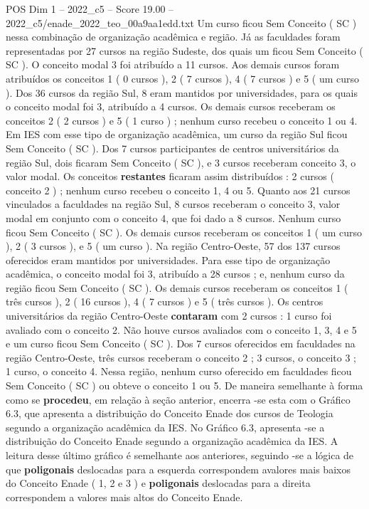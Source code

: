 \begin{textsample}{POS Dim 1 – 2022\_c5 – Score 19.00 – 2022\_c5/enade\_2022\_teo\_00a9aa1edd.txt}
Um curso ficou Sem Conceito ( SC ) nessa combinação de organização acadêmica e região.
Já as faculdades foram representadas por 27 cursos na região Sudeste, dos quais um ficou Sem Conceito ( SC ).
O conceito modal 3 foi atribuído a 11 cursos.
Aos demais cursos foram atribuídos os conceitos 1 ( 0 cursos ), 2 ( 7 cursos ), 4 ( 7 cursos ) e 5 ( um curso ).
Dos 36 cursos da região Sul, 8 eram mantidos por universidades, para os quais o conceito modal foi 3, atribuído a 4 cursos.
Os demais cursos receberam os conceitos 2 ( 2 cursos ) e 5 ( 1 curso ) ; nenhum curso recebeu o conceito 1 ou 4.
Em IES com esse tipo de organização acadêmica, um curso da região Sul ficou Sem Conceito ( SC ).
Dos 7 cursos participantes de centros universitários da região Sul, dois ficaram Sem Conceito ( SC ), e 3 cursos receberam conceito 3, o valor modal.
Os conceitos \textbf{restantes} ficaram assim distribuídos : 2 cursos ( conceito 2 ) ; nenhum curso recebeu o conceito 1, 4 ou 5.
Quanto aos 21 cursos vinculados a faculdades na região Sul, 8 cursos receberam o conceito 3, valor modal em conjunto com o conceito 4, que foi dado a 8 cursos.
Nenhum curso ficou Sem Conceito ( SC ).
Os demais cursos receberam os conceitos 1 ( um curso ), 2 ( 3 cursos ), e 5 ( um curso ).
Na região Centro-Oeste, 57 dos 137 cursos oferecidos eram mantidos por universidades.
Para esse tipo de organização acadêmica, o conceito modal foi 3, atribuído a 28 cursos ; e, nenhum curso da região ficou Sem Conceito ( SC ).
Os demais cursos receberam os conceitos 1 ( três cursos ), 2 ( 16 cursos ), 4 ( 7 cursos ) e 5 ( três cursos ).
Os centros universitários da região Centro-Oeste \textbf{contaram} com 2 cursos : 1 curso foi avaliado com o conceito 2.
Não houve cursos avaliados com o conceito 1, 3, 4 e 5 e um curso ficou Sem Conceito ( SC ).
Dos 7 cursos oferecidos em faculdades na região Centro-Oeste, três cursos receberam o conceito 2 ; 3 cursos, o conceito 3 ; 1 curso, o conceito 4.
Nessa região, nenhum curso oferecido em faculdades ficou Sem Conceito ( SC ) ou obteve o conceito 1 ou 5.
De maneira semelhante à forma como se \textbf{procedeu}, em relação à seção anterior, encerra -se esta com o Gráfico 6.3, que apresenta a distribuição do Conceito Enade dos cursos de Teologia segundo a organização acadêmica da IES.
No Gráfico 6.3, apresenta -se a distribuição do Conceito Enade segundo a organização acadêmica da IES.
A leitura desse último gráfico é semelhante aos anteriores, seguindo -se a lógica de que \textbf{poligonais} deslocadas para a esquerda correspondem avalores mais baixos do Conceito Enade ( 1, 2 e 3 ) e \textbf{poligonais} deslocadas para a direita correspondem a valores mais altos do Conceito Enade.

\end{textsample}
